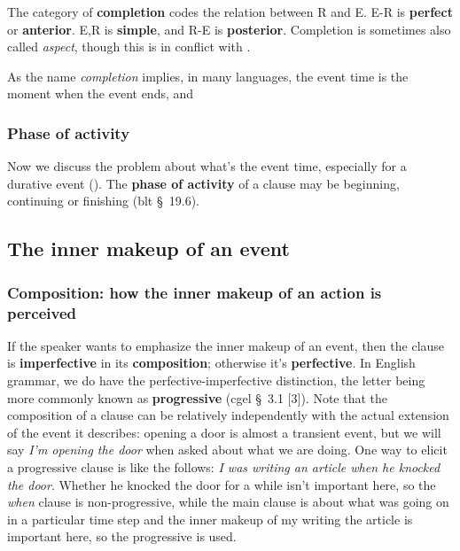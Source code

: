 \documentclass[UTF8, a4paper, oneside, scheme=plain]{ctexart}
\newcommand*{\citesec}[1]{\S~{#1}}
\newcommand*{\concept}[1]{\textbf{#1}}
\newcommand*{\term}[1]{\emph{#1}}
\newcommand*{\corpus}[1]{\emph{#1}}
\begin{document}
The category of \concept{completion} codes the relation between R and E.
E-R is \concept{perfect} or \concept{anterior}.
E,R is \concept{simple},
and R-E is \concept{posterior}.
Completion is sometimes also called \term{aspect},
though this is in conflict with .

As the name \term{completion} implies,
in many languages, the event time is the moment when the event ends,
and 

\subsubsection{Phase of activity}\label{sec:phase-of-activity}

Now we discuss the problem about what's the event time,
especially for a durative event ().
The \concept{phase of activity} of a clause 
may be beginning, continuing or finishing (\ac{blt} \citesec{19.6}).


\subsection{The inner makeup of an event}\label{sec:inner-make-up-event}

\subsubsection{Composition: how the inner makeup of an action is perceived}\label{sec:composition}

If the speaker wants to emphasize the inner makeup of an event,
then the clause is \concept{imperfective} in its \concept{composition};
otherwise it's \concept{perfective}.
In English grammar, 
we do have the perfective-imperfective distinction,
the letter being more commonly known as \concept{progressive}
(\ac{cgel} \citesec{3.1} [3]).
Note that the composition of a clause can be relatively independently 
with the actual extension of the event it describes:
opening a door is almost a transient event,
but we will say \corpus{I'm opening the door} when asked about what we are doing.
One way to elicit a progressive clause is like the follows:
\corpus{I was writing an article when he knocked the door}.
Whether he knocked the door for a while isn't important here,
so the \corpus{when} clause is non-progressive,
while the main clause is about what was going on in a particular time step
and the inner makeup of my writing the article is important here,
so the progressive is used.
\end{document}
